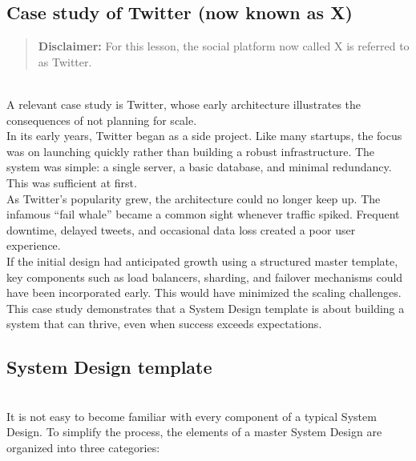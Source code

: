 \subsection{Case study of Twitter (now known as X)}\label{cROR-xQ9_fPVOkbExxC9H}
\begin{quote}
\textbf{Disclaimer:} For this lesson, the social platform now called X is referred to as Twitter.
\end{quote}
\\
A relevant case study is Twitter, whose early architecture illustrates the consequences of not planning for scale.
\\
In its early years, Twitter began as a side project. Like many startups, the focus was on launching quickly rather than building a robust infrastructure. The system was simple: a single server, a basic database, and minimal redundancy. This was sufficient at first.
\\
As Twitter's popularity grew, the architecture could no longer keep up. The infamous ``fail whale'' became a common sight whenever traffic spiked. Frequent downtime, delayed tweets, and occasional data loss created a poor user experience.
\\
If the initial design had anticipated growth using a structured master template, key components such as load balancers, sharding, and failover mechanisms could have been incorporated early. This would have minimized the scaling challenges.
\\
This case study demonstrates that a System Design template is about building a system that can thrive, even when success exceeds expectations.

\subsection{System Design template}\label{-j12iwvte6aMi54GeiJIZ}
\\
It is not easy to become familiar with every component of a typical System Design. To simplify the process, the elements of a master System Design are organized into three categories:

